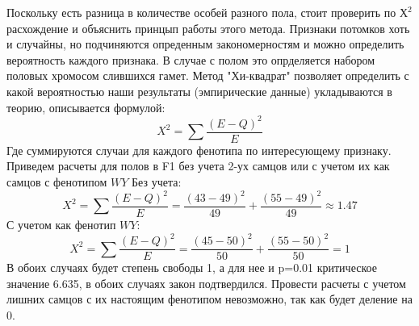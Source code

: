\documentclass[12pt,a4paper]{article}
\begin{document}
Поскольку есть разница в количестве особей разного пола, стоит проверить по $Х^2$ расхождение и объяснить принцып работы этого метода.
Признаки потомков хоть и случайны, но подчиняются опреденным закономерностям и можно определить вероятность каждого признака. В случае с полом это опрделяется набором половых хромосом слившихся гамет.
Метод "Хи-квадрат" позволяет определить с какой вероятностью наши результаты (эмпирические данные) укладываются в теорию, описывается формулой:
\begin{equation}
    X^2 = \sum \frac{(E-Q)^2}{E}
\end{equation}
Где суммируются случаи для каждого фенотипа по интересующему признаку.
Приведем расчеты для полов в F1 без учета 2-ух самцов или с учетом их как самцов с фенотипом $WY$
\newline Без учета:
\begin{equation}
    X^2 = \sum \frac{(E-Q)^2}{E} = \frac{(43-49)^2}{49} +\frac{(55-49)^2}{49} \approx 1.47
\end{equation}
\newline С учетом как фенотип $WY$:
\begin{equation}
    X^2 = \sum \frac{(E-Q)^2}{E} = \frac{(45-50)^2}{50} +\frac{(55-50)^2}{50} = 1
\end{equation}
В обоих случаях будет степень свободы 1, а для нее и p=0.01 критическое значение 6.635, в обоих случаях закон подтвердился.
Провести расчеты с учетом лишних самцов с их настоящим фенотипом невозможно, так как будет деление на 0.
\end{document}
